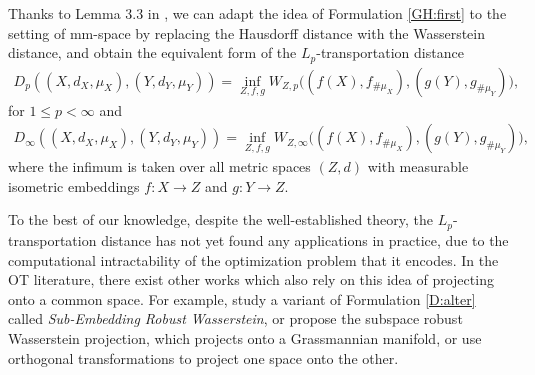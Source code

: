Thanks to Lemma 3.3 in \citep{Sturm06}, we can adapt the idea of Formulation \eqref{GH:first}
to the setting of mm-space by replacing the Hausdorff distance with the Wasserstein distance,
and obtain the equivalent form of the $L_p$-transportation distance
\begin{align}
   \label{D:alter}
  D_p((X, d_X, \mu_X), (Y, d_Y, \mu_Y)) =
  \inf_{Z, f, g} W_{Z, p} \big( (f(X), f_{\# \mu_X}), (g(Y), g_{\# \mu_Y}) \big),
\end{align}
for $1 \leq p < \infty$ and
\begin{align}
   \label{D:alter_infty}
  D_{\infty}((X, d_X, \mu_X), (Y, d_Y, \mu_Y)) =
  \inf_{Z, f, g} W_{Z, \infty}\big( (f(X), f_{\# \mu_X} ), (g(Y), g_{\# \mu_Y} ) \big),
\end{align}
where the infimum is taken over all metric spaces $(Z,d)$ with measurable isometric embeddings
$f: X \to Z$ and $g: Y \to Z$.

To the best of our knowledge, despite the well-established theory,
the $L_p$-transportation distance has not yet found any applications in practice,
due to the computational intractability of the optimization problem that it encodes.
In the OT literature, there exist other works which also rely on
this idea of projecting onto a common space.
For example, \citep{Alaya22} study a variant of Formulation \eqref{D:alter} called
\textit{Sub-Embedding Robust Wasserstein}, or
\citep{Paty19} propose the subspace robust Wasserstein projection,
which projects onto a Grassmannian manifold, or \citep{Cai22} use orthogonal transformations
to project one space onto the other.

